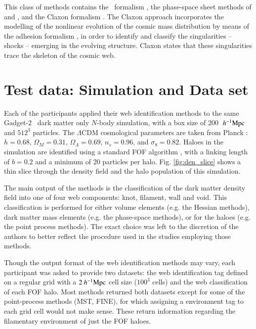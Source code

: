 \begin{itemize}
This class of methods contains the \origami\ formalism \citep{Falck2012,Falck2015}, the phase-space sheet methods of \cite{Shandarin2011} 
\citep[also see][]{Ramachandra2015} and \cite{Abel2012}, and the Claxon formalism \citep{Hidding2017}. The Claxon approach incorporates the modelling of 
the nonlinear evolution of the cosmic mass distribution by means of the adhesion 
formalism \citep{Gurbatov1989,Hidding2012}, in order to identify and classify the singularities -- shocks -- emerging 
in the evolving structure. Claxon states that these singularities trace the skeleton of the cosmic web. 
\end{itemize}
\section{Test data:  Simulation and Data set}
% 
\label{section:simulation}

Each of the participants applied their web identification methods to the same Gadget-2~\citep{Springel2005c} dark matter only $N$-body simulation, with a box size of 200 $~h^{-1}\rm Mpc$ and $512^3$ particles. The $\Lambda$CDM cosmological parameters are taken from Planck \citep{2014A&A...571A..16P}: $h=0.68$, $\Omega_M = 0.31$, $\Omega_\Lambda = 0.69$, $n_s = 0.96$, and $\sigma_8 = 0.82$. Haloes in the simulation are identified using a standard FOF algorithm \citep{Davis1985}, with a linking length of $b=0.2$ and a minimum of 20 particles per halo. Fig. \ref{fig:den_slice} shows a thin slice through the density field and the halo population of this simulation.

The main output of the methods is the classification of the dark matter density field into one of four web components: knot, filament, wall and void. This classification is performed for either volume elements (e.g. the Hessian methods), dark matter mass elements (e.g. the phase-space methods), or for the haloes (e.g. the point process methods). The exact choice was left to the discretion of the authors to better reflect the procedure used in the studies employing those methods. 

Though the output format of the web identification methods may vary, each participant was asked to provide two datasets: the web identification tag defined on a regular grid with a $2~h^{-1}\rm Mpc$ cell size ($100^3$ cells) and the web classification of each FOF halo. Most methods returned both datasets except for some of the point-process methods (MST, FINE), for which assigning a environment tag to each grid cell would not make sense. These return information regarding the filamentary environment of just the FOF haloes.


